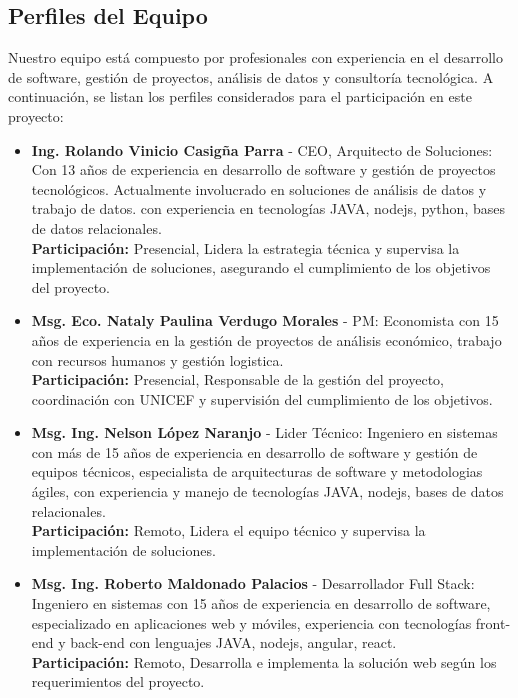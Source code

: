\subsection{Perfiles del Equipo}
Nuestro equipo está compuesto por profesionales con experiencia en el desarrollo de software, gestión de proyectos, análisis de datos y consultoría tecnológica. A continuación, se listan los perfiles considerados para el participación en este proyecto:
\begin{itemize}
        \item \textbf{Ing. Rolando Vinicio Casigña Parra} - CEO, Arquitecto de Soluciones: Con 13 años de experiencia en desarrollo de software y gestión de proyectos tecnológicos. Actualmente involucrado en soluciones de análisis de datos y trabajo de datos. con experiencia en tecnologías JAVA, nodejs, python, bases de datos relacionales.\\
        \textbf{Participación:} Presencial, Lidera la estrategia técnica y supervisa la implementación de soluciones, asegurando el cumplimiento de los objetivos del proyecto.
        \item \textbf{Msg. Eco. Nataly Paulina Verdugo Morales} - PM: Economista con 15 años de experiencia en la gestión de proyectos de análisis económico, trabajo con recursos humanos y gestión logistica.\\
        \textbf{Participación:} Presencial, Responsable de la gestión del proyecto, coordinación con UNICEF y supervisión del cumplimiento de los objetivos.\\
        \item \textbf{Msg. Ing. Nelson López Naranjo} - Lider Técnico: Ingeniero en sistemas con más de 15 años de experiencia en desarrollo de software y gestión de equipos técnicos, especialista de arquitecturas de software y metodologias ágiles, con experiencia y manejo de tecnologías JAVA, nodejs, bases de datos relacionales. \\
        \textbf{Participación:} Remoto, Lidera el equipo técnico y supervisa la implementación de soluciones. \\
        \item \textbf{Msg. Ing. Roberto Maldonado Palacios} - Desarrollador Full Stack: Ingeniero en sistemas con 15 años de experiencia en desarrollo de software, especializado en aplicaciones web y móviles, experiencia con tecnologías front-end y back-end con lenguajes JAVA, nodejs, angular, react. \\
        \textbf{Participación:} Remoto, Desarrolla e implementa la solución web según los requerimientos del proyecto.\\

\end{itemize}
